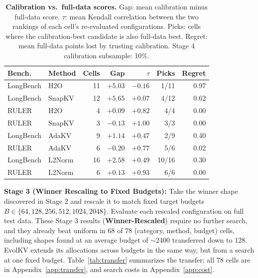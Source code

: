 \documentclass[11pt]{article}
\begin{document}
\begin{table}[htbp]
  \centering
  \footnotesize
  \setlength{\tabcolsep}{2.5pt}
  \begin{tabular}{@{} l l r r r r r @{}}
    \toprule
    \textbf{Bench.} & \textbf{Method} & \textbf{Cells} & \textbf{Gap} & \textbf{$\tau$} & \textbf{Picks} & \textbf{Regret} \\
    \midrule
    \rowcolor{gray!10}
    LongBench & H2O    & 11 & $+5.03$ & $-0.16$ & 1/11 & 0.97 \\
    LongBench & SnapKV & 12 & $+5.65$ & $+0.07$ & 4/12 & 0.62 \\
    \rowcolor{gray!10}
    RULER     & H2O    & 4  & $+0.09$ & $+0.82$ & 4/4  & 0.00 \\
    RULER     & SnapKV & 3  & $-0.13$ & $+1.00$ & 3/3  & 0.00 \\
    \midrule
    \rowcolor{gray!10}
    LongBench & AdaKV & 9 & $+1.14$ & $+0.47$ & 2/9 & 0.40 \\
    RULER     & AdaKV  & 6  & $-0.20$ & $+0.77$ & 5/6  & 0.02 \\
    \midrule
    \rowcolor{gray!10}
    LongBench & L2Norm & 16 & $+2.58$ & $+0.49$ & 10/16 & 0.30 \\
    RULER     & L2Norm & 6  & $+0.13$ & $+0.93$ & 6/6   & 0.00 \\
    \bottomrule
  \end{tabular}
  \caption{\textbf{Calibration vs.\ full-data scores.} Gap: mean calibration minus full-data score. $\tau$: mean Kendall correlation between the two rankings of each cell's re-evaluated configurations. Picks: cells where the calibration-best candidate is also full-data best. Regret: mean full-data points lost by trusting calibration. Stage 4 calibration subsample: 10\%.}
  \label{tab:calib}
\end{table}

\textbf{Stage 3 (Winner Rescaling to Fixed Budgets):} Take the winner shape discovered in Stage 2 and rescale it to match fixed target budgets $B \in \{64, 128, 256, 512, 1024, 2048\}$. Evaluate each rescaled configuration on full test data. These Stage 3 results (\textbf{Winner-Rescaled}) require no further search, and they already beat uniform in 68 of 78 (category, method, budget) cells, including shapes found at an average budget of $\sim$2400 transferred down to 128. EvolKV extends its allocations across budgets in the same way, but from a search at one fixed budget. Table~\ref{tab:transfer} summarizes the transfer; all 78 cells are in Appendix~\ref{app:transfer}, and search costs in Appendix~\ref{app:cost}.
\end{document}
